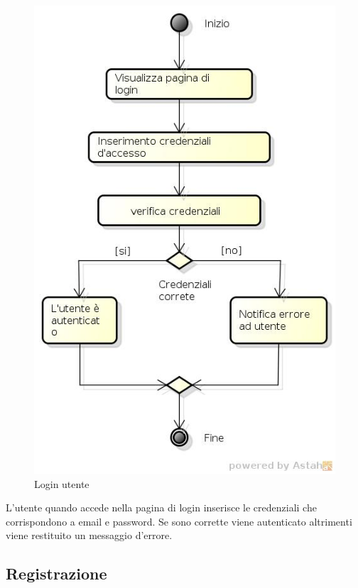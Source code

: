 \begin{figure}[h!]
		\centering
		\includegraphics[scale=.2]{img/Login.jpg}
		\caption{Login utente}
		\label{fig:ModelloSpy}
\end{figure}

L'utente quando accede nella pagina di login inserisce le credenziali che corrispondono a email e password. Se sono corrette viene autenticato altrimenti viene restituito un messaggio d'errore.

\subsection{Registrazione}

